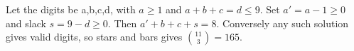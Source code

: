 Let the digits be a,b,c,d, with $a\ge1$ and $a+b+c=d\le9$. Set $a\prime=a-1\ge0$ and slack $s=9-d\ge0$. Then $a\prime+b+c+s=8$. Conversely any such solution gives valid digits, so stars and bars gives $\binom{11}{3}=\boxed{165}$.
